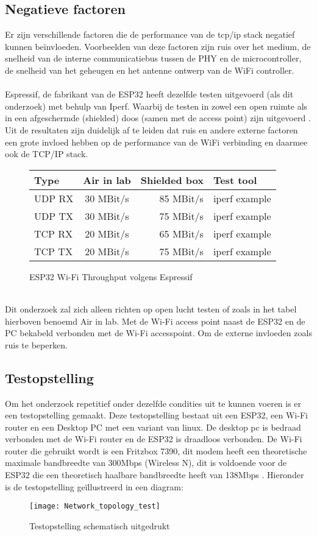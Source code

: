\documentclass[../DCM2_Verslag.tex]{subfiles}
\begin{document}
\subsection{Negatieve factoren}
Er zijn verschillende factoren die de performance van de tcp/ip stack negatief kunnen beïnvloeden. Voorbeelden van deze factoren zijn ruis over het medium, de snelheid van de interne communicatiebus tussen de PHY en de microcontroller, de snelheid van het geheugen en het antenne ontwerp van de WiFi controller.\\\\
Espressif, de fabrikant van de ESP32 heeft dezelfde testen uitgevoerd (als dit onderzoek) met behulp van Iperf. Waarbij de testen in zowel een open ruimte als in een afgeschermde (shielded) doos (samen met de access point) zijn uitgevoerd \parencite{espressifperformance}. Uit de resultaten zijn duidelijk af te leiden dat ruis en andere externe factoren een grote invloed hebben op de performance van de WiFi verbinding en daarmee ook de TCP/IP stack.\\
\begin{figure}[h]
\begin{tabular}{||l|c|r|p{6cm}||}
	 \hline
 	 Type & Air in lab & Shielded box & Test tool \\
  	 \hline \hline    
   	 UDP RX & 30 MBit/s & 85 MBit/s & iperf example \\
   	 UDP TX & 30 MBit/s & 75 MBit/s & iperf example \\
   	 TCP RX & 20 MBit/s & 65 MBit/s & iperf example \\
   	 TCP TX & 20 MBit/s & 75 MBit/s & iperf example \\
\end{tabular}
\caption{ESP32 Wi-Fi Throughput volgens Espressif}
\end{figure}
\\Dit onderzoek zal zich alleen richten op open lucht testen of zoals in het tabel hierboven benoemd Air in lab. Met de Wi-Fi access point naast de ESP32 en de PC bekabeld verbonden met de Wi-Fi accesspoint. Om de externe invloeden zoals ruis te beperken.

\subsection{Testopstelling}
Om het onderzoek repetitief onder dezelfde condities uit te kunnen voeren is er een testopstelling gemaakt. Deze testopstelling bestaat uit een ESP32, een Wi-Fi router en een Desktop PC met een variant van linux. De desktop pc is bedraad verbonden met de Wi-Fi router en de ESP32 is draadloos verbonden. De Wi-Fi router die gebruikt wordt is een Fritzbox 7390, dit modem heeft een theoretische maximale bandbreedte van 300Mbps (Wireless N), dit is voldoende voor de ESP32 die een theoretisch haalbare bandbreedte heeft van 138Mbps \parencite{esptechref}. Hieronder is de testopstelling geïllustreerd in een diagram:
\begin{figure}[h]
\centering
\texttt{[image: Network\_topology\_test]}
\caption{Testopstelling schematisch uitgedrukt}
\end{figure}
\end{document}
